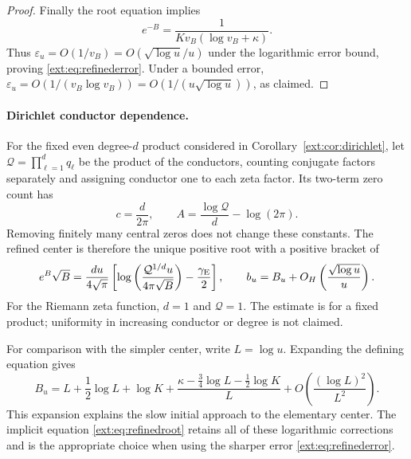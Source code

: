 \documentclass[11pt]{article}
\theoremstyle{definition}
\theoremstyle{remark}
\begin{document}
\begin{proof}
Finally the root equation implies
\[
 e^{-B}=
  \frac1{K v_B(\log v_B+\kappa)}.
\]
Thus $\varepsilon_u=O(1/v_B)
=O(\sqrt{\log u}/u)$ under the logarithmic error bound, proving
\eqref{ext:eq:refinederror}.  Under a bounded error,
$\varepsilon_u=O(1/(v_B\log v_B))
=O(1/(u\sqrt{\log u}))$, as claimed.
\end{proof}

\paragraph{Dirichlet conductor dependence.}
For the fixed even degree-$d$ product considered in
Corollary~\ref{ext:cor:dirichlet}, let
$\mathcal Q=\prod_{\ell=1}^d q_\ell$ be the product of the conductors,
counting conjugate factors separately and assigning conductor one to
each zeta factor.  Its two-term zero count has
\[
 c=\frac d{2\pi},\qquad
 A=\frac{\log\mathcal Q}{d}-\log(2\pi).
\]
Removing finitely many central zeros does not change these constants.
The refined center is therefore the unique positive root with a
positive bracket of
\begin{equation}\label{ext:eq:dirichletrefined}
 e^B\sqrt B
  =\frac{du}{4\sqrt\pi}
       \left[
        \log\left(\frac{\mathcal Q^{1/d}u}{4\pi\sqrt B}\right)
             -\frac{\gamma_{\rm E}}2
       \right],
 \qquad
 b_u=B_u+O_H\left(\frac{\sqrt{\log u}}u\right).
\end{equation}
For the Riemann zeta function, $d=1$ and $\mathcal Q=1$.
The estimate is for a fixed product; uniformity in increasing
conductor or degree is not claimed.

For comparison with the simpler center, write $L=\log u$.  Expanding
the defining equation gives
\[
 B_u=L+\frac12\log L+\log K
       +\frac{\kappa-\frac34\log L-\frac12\log K}{L}
       +O\left(\frac{(\log L)^2}{L^2}\right).
\]
This expansion explains the slow initial approach to the elementary
center.  The implicit equation \eqref{ext:eq:refinedroot} retains all
of these logarithmic corrections and is the appropriate choice when
using the sharper error \eqref{ext:eq:refinederror}.
\end{document}

